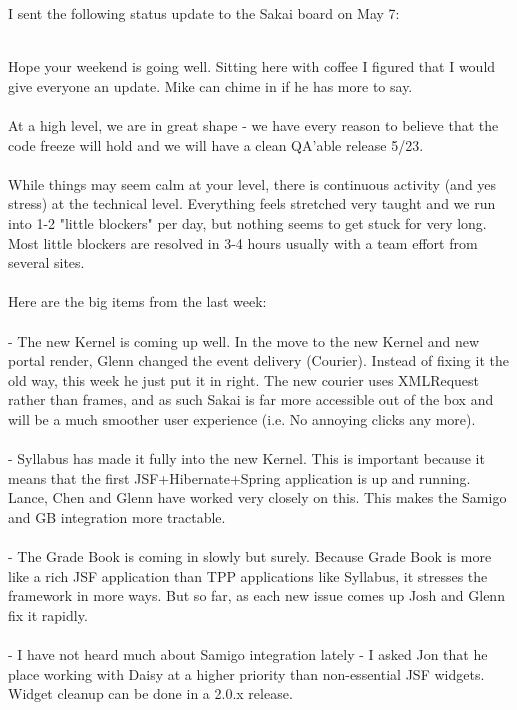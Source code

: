 \documentclass[12pt]{book}
\begin{document}
I sent the following status update to the Sakai board on
May 7:\\
\\
\begin{sf}
Hope your weekend is going well. Sitting here with coffee I
figured that I would give everyone an update.  Mike can
chime in if he has more to say.\\
\\
At a high level, we are in great shape - we have every
reason to believe that the code freeze will hold and we
will have a clean QA'able release 5/23.\\
\\
While things may seem calm at your level, there is
continuous activity (and yes stress) at the technical
level.  Everything feels stretched very taught and we run
into 1-2 "little blockers" per day, but nothing seems to
get stuck for very long.  Most little blockers are resolved
in 3-4 hours usually with a team effort from several sites.\\
\\
Here are the big items from the last week:\\
\\
- The new Kernel is coming up well.  In the move to the
new Kernel and new portal render, Glenn changed the event
delivery (Courier).  Instead of fixing it the old way,
this week he just put it in right.  The new courier uses
XMLRequest rather than frames, and as such Sakai is far
more accessible out of the box and will be a much smoother
user experience (i.e. No annoying clicks any more).\\
\\
- Syllabus has made it fully into the new Kernel.  This
is important because it means that the first
JSF+Hibernate+Spring application is up and running.
Lance, Chen and Glenn have worked very closely on this.
This makes the Samigo and GB integration more tractable.\\
\\
- The Grade Book is coming in slowly but surely.  Because
Grade Book is more like a rich JSF application than TPP
applications like Syllabus, it stresses the framework in
more ways.  But so far, as each new issue comes up Josh
and Glenn fix it rapidly.\\
\\
- I have not heard much about Samigo integration lately -
I asked Jon that he place working with Daisy at a higher
priority than non-essential JSF widgets. Widget cleanup
can be done in a 2.0.x release.\\

\end{sf}
\end{document}
